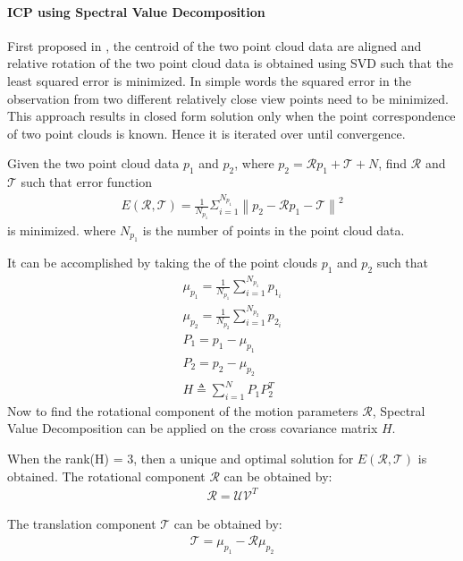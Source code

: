 \paragraph{ICP using Spectral Value Decomposition}
First proposed in \cite{KS.Arun}, the centroid of the two point cloud data are aligned and relative rotation of the two point cloud data is obtained using SVD such that the least squared error is minimized. In simple words the squared error in the observation from two different relatively close view points need to be minimized. This approach results in closed form solution only when the point correspondence of two point clouds is known. Hence it is iterated over until convergence.
\par
Given the two point cloud data $p_1$ and $p_2$, where $p_2 = \mathcal{R} p_1 + \mathcal{T} + N$, find $\mathcal{R}$ and $\mathcal{T}$ such that error function
\begin{gather} \label{ICP-error}
    E(\mathcal{R}, \mathcal{T}) = \frac{1}{N_{p_1}}  \Sigma_{i=1}^{N_{p_1}}\left\lVert p_2 - \mathcal{R} p_1 -\mathcal{T} \right\rVert^2 
\end{gather}
is minimized.
where $N_{p_1}$ is the number of points in the point cloud data.

It can be accomplished by taking the  of the point clouds $p_{1}$ and $p_{2}$ such that
\begin{gather} \label{ICP}
            \mu_{p_1} = \frac{1}{N_{p_1}} \sum\limits_{i=1}^{N_{p_1}} p_{1_i}\\
            \mu_{p_2} = \frac{1}{N_{p_2}}  \sum\limits_{i=1}^{N_{p_2}} p_{2_i}\\
            P_{1} = p_{1} - \mu_{p_{1}}\\
            P_{2} = p_{2} - \mu_{p_{2}}\\
            H  \triangleq  \sum\limits_{i=1}^{N} P_{1} P_{2}^{T}
\end{gather}
Now to find the rotational component of the motion parameters $\mathcal{R}$, Spectral Value Decomposition can be applied on the cross covariance matrix $H$.

When the rank(H) = 3, then a unique and optimal solution for $E(\mathcal{R}, \mathcal{T})$ is obtained. The rotational component $\mathcal{R}$ can be obtained by:
\begin{gather} 
\mathcal{R} = \mathcal{U} \mathcal{V}^T
\end{gather}

The translation component $\mathcal{T}$ can be obtained by:
\begin{gather}
\mathcal{T} = \mu_{p_1} - \mathcal{R}\mu_{p_2}
\end{gather}

